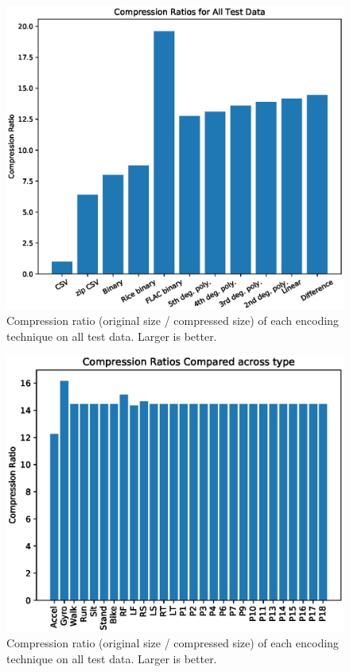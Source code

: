 \documentclass[journal]{IEEEtran}
\begin{document}
\begin{figure}

  \includegraphics[width=\linewidth]{prelim_results.eps}
  \caption{Compression ratio (original size / compressed size) of each encoding technique on all test data. Larger is better.}
  \label{fig:main_results}
  
\end{figure}
\begin{figure}

  \includegraphics[width=\linewidth]{results_type_split.eps}
  \caption{Compression ratio (original size / compressed size) of each encoding technique on all test data. Larger is better.}
  \label{fig:split_results}
  
\end{figure}
\end{document}
